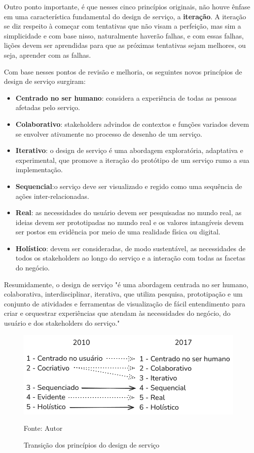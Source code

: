 Outro ponto importante, é que nesses cinco princípios originais, não houve ênfase em uma característica fundamental do design de serviço, a \textbf{iteração}. A iteração se diz respeito à começar com tentativas que não visam a perfeição, mas sim a simplicidade e com base nisso, naturalmente haverão falhas, e com essas falhas, lições devem ser aprendidas para que as próximas tentativas sejam melhores, ou seja, aprender com as falhas.

Com base nesses pontos de revisão e melhoria, os seguintes novos princípios de design de serviço surgiram: \cite{Stickdorn2019}

\begin{itemize}
	\item \textbf{Centrado no ser humano}: considera a experiência de todas as pessoas afetadas pelo serviço.
	\item \textbf{Colaborativo}: stakeholders advindos de contextos e funções variados devem se envolver ativamente no processo de desenho de um serviço.
	\item \textbf{Iterativo}: o design de serviço é uma abordagem exploratória, adaptativa e experimental, que promove a iteração do protótipo de um serviço rumo a sua implementação.
	\item \textbf{Sequencial}:o serviço deve ser visualizado e regido como uma sequência de ações inter-relacionadas.
	\item \textbf{Real}: as necessidades do usuário devem ser pesquisadas no mundo real, as ideias devem ser prototipadas no mundo real e os valores intangíveis devem ser postos em evidência por meio de uma realidade física ou digital.
	\item \textbf{Holístico}:  devem ser consideradas, de modo sustentável, as necessidades de todos os stakeholders ao longo do serviço e a interação com todas as facetas do negócio.
\end{itemize}

Resumidamente, o design de serviço "é uma abordagem centrada no ser humano, colaborativa, interdisciplinar, iterativa, que utiliza pesquisa, prototipação e um conjunto de atividades e ferramentas de visualização de fácil entendimento para criar e orquestrar experiências que atendam às necessidades do negócio, do usuário e dos stakeholders do serviço."\cite{Stickdorn2019}

\begin{figure}[h]
	\centering %
	\includegraphics[width=17cm]{figuras/principios.png} %
	\caption{Transição dos princípios do design de serviço}
	Fonte: Autor
	\label{figura:qualquernome}
\end{figure}

